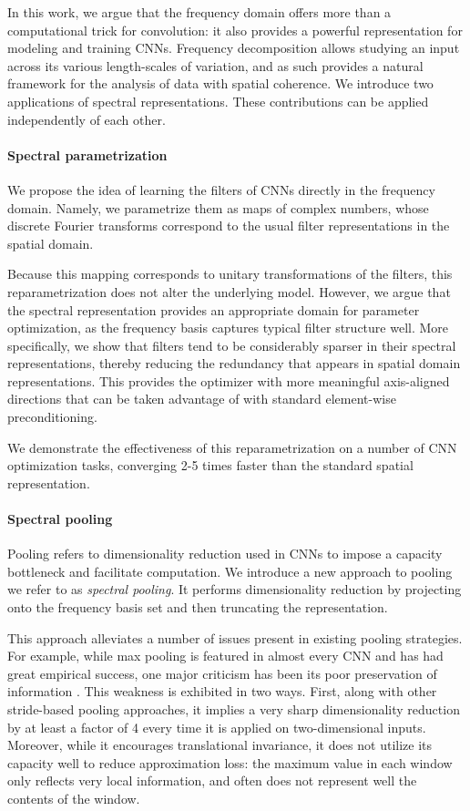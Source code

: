 \documentclass{article} \usepackage{nips15submit_e,times}
\begin{document}
In this work, we argue that the frequency domain offers more than a computational trick for convolution: it also provides a powerful representation for modeling and training CNNs.  Frequency decomposition allows studying an input across its various length-scales of variation, and as such provides a natural framework for the analysis of data with spatial coherence.  We introduce two applications of spectral representations. These contributions can be applied independently of each other. 

\paragraph{Spectral parametrization} We propose the idea of learning the filters of CNNs directly in the frequency domain. Namely, we parametrize them as maps of complex numbers, whose discrete Fourier transforms correspond to the usual filter representations in the spatial domain. 

Because this mapping corresponds to unitary transformations of the filters, this reparametrization does not alter the underlying model.  However, we argue that the spectral representation provides an appropriate domain for parameter optimization, as the frequency basis captures typical filter structure well. More specifically, we show that filters tend to be considerably sparser in their spectral representations, thereby reducing the redundancy that appears in spatial domain representations. This provides the optimizer with more meaningful axis-aligned directions that can be taken advantage of with standard element-wise preconditioning.

We demonstrate the effectiveness of this reparametrization on a number of CNN optimization tasks, converging 2-5 times faster than the standard spatial representation.

\paragraph{Spectral pooling} Pooling refers to dimensionality reduction used in CNNs to impose a capacity bottleneck and facilitate computation. We introduce a new approach to pooling we refer to as \emph{spectral pooling}. It performs dimensionality reduction by projecting onto the frequency basis set and then truncating the representation.

This approach alleviates a number of issues present in existing pooling strategies. For example, while max pooling is featured in almost every CNN and has had great empirical success, one major criticism has been its poor preservation of information \citep{hinton_ama,hinton-2014}. This weakness is exhibited in two ways. First, along with other stride-based pooling approaches, it implies a very sharp dimensionality reduction by at least a factor of 4 every time it is applied on two-dimensional inputs. Moreover, while it encourages translational invariance, it does not utilize its capacity well to reduce approximation loss: the maximum value in each window only reflects very local information, and often does not represent well the contents of the window.
\end{document}
